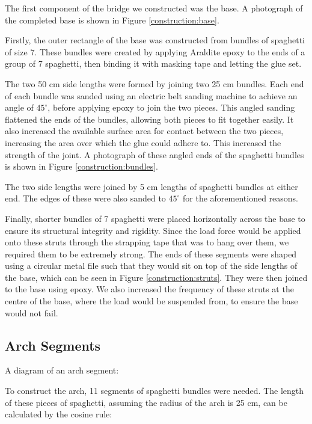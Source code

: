\documentclass[a4paper,11pt]{article}
\begin{document}
The first component of the bridge we constructed was the base.
A photograph of the completed base is shown in Figure \ref{construction:base}.

Firstly, the outer rectangle of the base was constructed from bundles of
spaghetti of size 7.
These bundles were created by applying Araldite epoxy to the ends of a group of
7 spaghetti, then binding it with masking tape and letting the glue set.

The two 50 cm side lengths were formed by joining two 25 cm bundles.
Each end of each bundle was sanded using an electric belt sanding machine to
achieve an angle of $45^\circ$, before applying epoxy to join the two pieces.
This angled sanding flattened the ends of the bundles, allowing both pieces to
fit together easily. It also increased the available surface area for contact
between the two pieces, increasing the area over which the glue could adhere to.
This increased the strength of the joint.
A photograph of these angled ends of the spaghetti bundles is shown in Figure
\ref{construction:bundles}.

The two side lengths were joined by 5 cm lengths of spaghetti bundles at either
end. The edges of these were also sanded to $45^\circ$ for the aforementioned
reasons.

Finally, shorter bundles of 7 spaghetti were placed horizontally across the base
to ensure its structural integrity and rigidity.
Since the load force would be applied onto these struts through the strapping
tape that was to hang over them, we required them to be extremely strong.
The ends of these segments were shaped using a circular metal file such that
they would sit on top of the side lengths of the base, which can be seen in
Figure \ref{construction:struts}.
They were then joined to the base using epoxy.
We also increased the frequency of these struts at the centre of the base,
where the load would be suspended from, to ensure the base would not fail.


\subsection{Arch Segments}

A diagram of an arch segment:

\vspace{4cm}

To construct the arch, 11 segments of spaghetti bundles were needed.
The length of these pieces of spaghetti, assuming the radius of the arch is 25
cm, can be calculated by the cosine rule:
\end{document}

